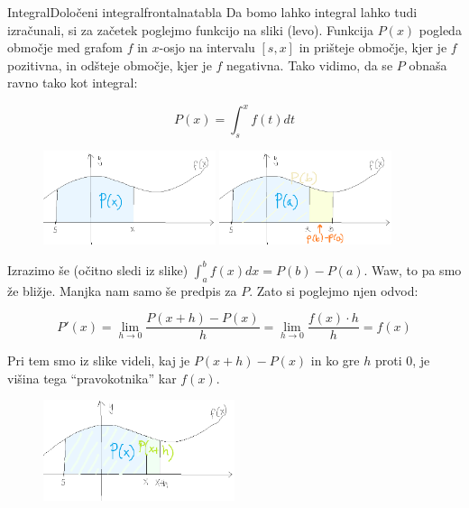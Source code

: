 \begin{priprava}{}{}{Integral}{Določeni integral}{frontalna}{tabla}
Da bomo lahko integral lahko tudi izračunali, si za začetek poglejmo funkcijo na sliki (levo). Funkcija $ P(x) $ pogleda območje med grafom $ f $ in $ x $-osjo na intervalu $ [ s, x] $  in prišteje območje, kjer je $ f $ pozitivna, in odšteje območje, kjer je $ f $ negativna. Tako vidimo, da se $ P $ obnaša ravno tako kot integral:

$$ P(x) = \int_s^x f(t) dt $$

\begin{figure}[h]
    \centering
    \includegraphics[width=0.45\textwidth]{slike/NL_P(x).png}
    \includegraphics[width=0.45\textwidth]{slike/NL_P(b)-P(a).png}
\end{figure}

Izrazimo še (očitno sledi iz slike) $ \int_a^b f(x) dx = P(b) - P(a) $. Waw, to pa smo že bližje. Manjka nam samo še predpis za $ P $. Zato si  poglejmo njen odvod:

$$
P'(x) = \lim_{h \rightarrow 0} \frac{P(x + h) - P(x)}{h} = \lim_{h \rightarrow 0} \frac{f(x) \cdot h}{h} = f(x)
$$

Pri tem smo iz slike videli, kaj je $ P(x + h) - P(x) $ in ko gre $ h $ proti 0, je višina tega ``pravokotnika'' kar $ f(x) $.

\newpage

\begin{figure}[h]
    \centering
    \includegraphics[width=0.5\textwidth]{slike/NL_P(x)_P(x+h).png}
\end{figure}



\end{priprava}
